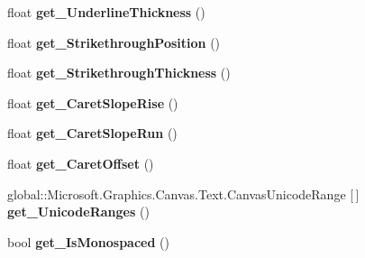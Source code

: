 \begin{DoxyCompactItemize}
float {\bfseries get\+\_\+\+Underline\+Thickness} ()
\item 
\mbox{\label{interface_microsoft_1_1_graphics_1_1_canvas_1_1_text_1_1_i_canvas_font_face_ab8561bb6f25efcb7273a64643b775446}} 
float {\bfseries get\+\_\+\+Strikethrough\+Position} ()
\item 
\mbox{\label{interface_microsoft_1_1_graphics_1_1_canvas_1_1_text_1_1_i_canvas_font_face_a8b2172bffa082892e3694388ec8eac13}} 
float {\bfseries get\+\_\+\+Strikethrough\+Thickness} ()
\item 
\mbox{\label{interface_microsoft_1_1_graphics_1_1_canvas_1_1_text_1_1_i_canvas_font_face_af3b9557d3b74df1a6428d777de82e6b1}} 
float {\bfseries get\+\_\+\+Caret\+Slope\+Rise} ()
\item 
\mbox{\label{interface_microsoft_1_1_graphics_1_1_canvas_1_1_text_1_1_i_canvas_font_face_a49aeb124fbec7a5988ab8303e083297f}} 
float {\bfseries get\+\_\+\+Caret\+Slope\+Run} ()
\item 
\mbox{\label{interface_microsoft_1_1_graphics_1_1_canvas_1_1_text_1_1_i_canvas_font_face_a0e9776e90c455486f21ab8fc00fe5e28}} 
float {\bfseries get\+\_\+\+Caret\+Offset} ()
\item 
\mbox{\label{interface_microsoft_1_1_graphics_1_1_canvas_1_1_text_1_1_i_canvas_font_face_a116af1ab6e266a4c51cf12d7531d3937}} 
global\+::\+Microsoft.\+Graphics.\+Canvas.\+Text.\+Canvas\+Unicode\+Range \mbox{[}$\,$\mbox{]} {\bfseries get\+\_\+\+Unicode\+Ranges} ()
\item 
\mbox{\label{interface_microsoft_1_1_graphics_1_1_canvas_1_1_text_1_1_i_canvas_font_face_a3a4a5906deaf935d359585881c5fdd7d}} 
bool {\bfseries get\+\_\+\+Is\+Monospaced} ()
\item 

\end{DoxyCompactItemize}
